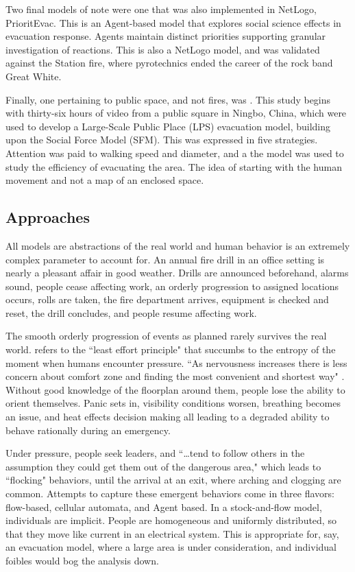\documentclass[12pt,letterpaper]{article}
\begin{document}
Two final models of note were one that was also implemented in NetLogo, \cite{prioritEvac} PrioritEvac. This is an Agent-based model that explores social science effects in evacuation response. Agents maintain distinct priorities supporting granular investigation of reactions. This is also a NetLogo model, and was validated against the Station fire, where pyrotechnics ended the career of the rock band Great White.

Finally, one pertaining to public space, and not fires, was \cite{zhouSimulationPedestrianEvacuation2019}. This study begins with thirty-six hours of video from a public square in Ningbo, China, which were used to develop a Large-Scale Public Place (LPS) evacuation model, building upon the Social Force Model (SFM). This was expressed in five strategies. Attention was paid to walking speed and diameter, and a the model was used to study the efficiency of evacuating the area. The idea of starting with the human movement and not a map of an enclosed space.

\subsection {Approaches}
All models are abstractions of the real world and human behavior is an extremely complex parameter to account for. An annual fire drill in an office setting is nearly a pleasant affair in good weather. Drills are announced beforehand, alarms sound, people cease affecting work, an orderly progression to assigned locations occurs, rolls are taken, the fire department arrives, equipment is checked and reset, the drill concludes, and people resume affecting work.


The smooth orderly progression of events as planned rarely survives the real world.  \cite{almeidaCrowdSimulationModeling2013} refers to the ``least effort principle" that succumbs to the entropy of the moment when humans encounter pressure.  ``As nervousness increases there is less concern about comfort zone and finding the most convenient and shortest way" \cite{almeidaCrowdSimulationModeling2013}. Without good knowledge of the floorplan around them, people lose the ability to orient themselves. Panic sets in, visibility conditions worsen, breathing becomes an issue, and heat effects decision making all leading to a degraded ability to behave rationally during an emergency.

Under pressure, people seek leaders, and ``\dots tend to follow others in the assumption they could get them out of the dangerous area," which leads to ``flocking" behaviors, until the arrival at an exit, where arching and clogging are common.  Attempts to capture these emergent behaviors come in three flavors: flow-based, cellular automata, and Agent based. In a stock-and-flow model, individuals are implicit. People are homogeneous and uniformly distributed, so that they move like current in an electrical system. This is appropriate for, say, an evacuation model, where a large area is under consideration, and individual foibles would bog the analysis down.
\end{document}
